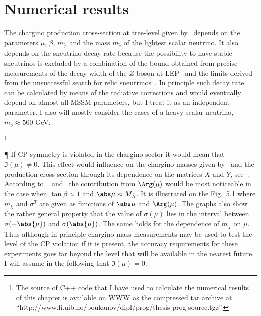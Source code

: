 \chapter{Numerical results}

The chargino production cross-section at tree-level given by~
depends on the parameters $\mu$, $\beta$, $m_{\tilde\Lambda}$ and the mass $m_{\tilde{\nu}}$
of the lightest scalar neutrino. It also depends on 
the sneutrino decay rate because the possibility to have stable 
sneutrinos is excluded by a combination of the bound 
obtained from precise measurements of the decay width 
of the $Z$ boson at LEP~\cite{LEPConstrainOnStableSneutrino}
and the limits derived from the unsuccessful search for relic 
sneutrinos~\cite{GermaniumConstrainOnStableSneutrino}. In principle
such decay rate can be calculated by means of the radiative corrections
and would eventually depend on almost all MSSM parameters, but I treat it
as an independent parameter. I also will mostly consider the cases of a heavy
scalar neutrino, $m_{\tilde\nu} \approx 500$ GeV. 

\footnote{
The source of C++ code that I have used to calculate the numerical 
results of this chapter is available on WWW as the compressed tar archive at 
``http://www.fi.uib.no/{}boukanov/dipl/prog/thesis-prog-source.tgz''.
}

\P
If CP symmetry is violated in the chargino sector it would mean that 
$\Im(\mu) \ne 0$. This effect would influence on the chargino masses
given by~ and the production cross section 
through its dependence on the matrices $X$ and $Y$, see~.
According to ~ and~ the contribution
from $\Arg(\mu)$ would be most noticeable in the case when 
$\tan\beta \approx 1$ and $\abs\mu \approx M_{\tilde\Lambda}$.
It is illustrated on the Fig.~5.1 where 
$m_\chi$ and $\sigma^T$ are given as functions
of $\abs\mu$ and $\Arg(\mu)$. 
The graphs also show the rather general property
that the value of $\sigma(\mu)$ lies in the interval 
between $\sigma(-\abs{\mu})$ and $\sigma(\abs{\mu})$. The same holds for 
the dependence of $m_\chi$ on $\mu$. 
Thus although in principle chargino mass measurements may be used to 
test the level of the CP violation if it is present, the accuracy requirements
for these experiments goes far beyond the level that will be available 
in the nearest future. 
I will assume in the following that $\Im(\mu) = 0$. 


